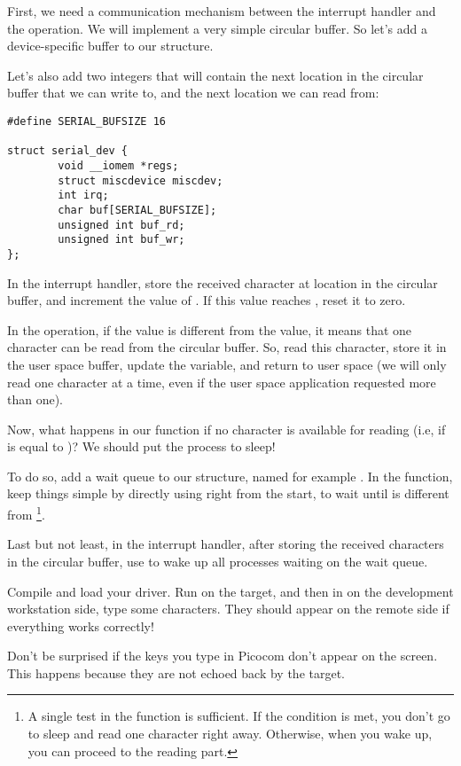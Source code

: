 First, we need a communication mechanism between the interrupt handler
and the  operation. We will implement a very simple
circular buffer. So let's add a device-specific buffer to our
 structure.

Let's also add two integers that will contain the next location
in the circular buffer that we can write to, and the next location
we can read from:

\begin{verbatim}
#define SERIAL_BUFSIZE 16

struct serial_dev {
        void __iomem *regs;
        struct miscdevice miscdev;
        int irq;
        char buf[SERIAL_BUFSIZE];
        unsigned int buf_rd;
        unsigned int buf_wr;
};
\end{verbatim}

In the interrupt handler, store the received character at location
 in the circular buffer, and increment the value
of . If this value reaches ,
reset it to zero.

In the  operation, if the  value is
different from the  value, it means that one
character can be read from the circular buffer. So, read this
character, store it in the user space buffer, update the
 variable, and return to user space (we will only
read one character at a time, even if the user space application
requested more than one).

Now, what happens in our  function if no character is
available for reading (i.e, if  is equal to
)? We should put the process to sleep!

To do so, add a wait queue to our  structure,
named for example . In the  function,
keep things simple by directly using 
right from the start, to wait until 
is different from \footnote{A single test in the
 function is sufficient. If the
condition is met, you don't go to sleep and read one character right away.
Otherwise, when you wake up, you can proceed to the reading part.}.

Last but not least, in the interrupt handler,
after storing the received characters in the circular buffer, use
 to wake up all processes waiting on the wait queue.

Compile and load your driver. Run 
on the target, and then in  on the development
workstation side, type some characters. They should appear on the
remote side if everything works correctly!

Don't be surprised if the keys you type in Picocom don't appear on the
screen. This happens because they are not echoed back by the target.

